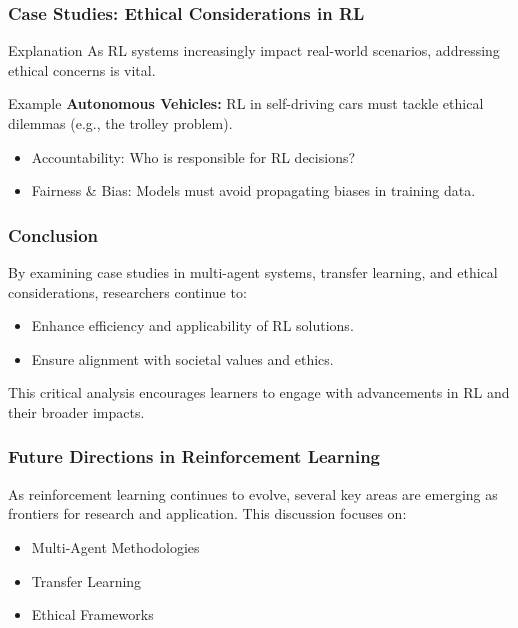 \documentclass[aspectratio=169]{beamer}
\begin{document}
\begin{frame}[fragile]
    \frametitle{Case Studies: Ethical Considerations in RL}
    \begin{block}{Explanation}
        As RL systems increasingly impact real-world scenarios, addressing ethical concerns is vital.
    \end{block}
    
    \begin{block}{Example}
        \textbf{Autonomous Vehicles:} RL in self-driving cars must tackle ethical dilemmas (e.g., the trolley problem).
    \end{block}
    
    \begin{itemize}
        \item Accountability: Who is responsible for RL decisions?
        \item Fairness \& Bias: Models must avoid propagating biases in training data.
    \end{itemize}
\end{frame}

\begin{frame}[fragile]
    \frametitle{Conclusion}
    By examining case studies in multi-agent systems, transfer learning, and ethical considerations, researchers continue to:
    \begin{itemize}
        \item Enhance efficiency and applicability of RL solutions.
        \item Ensure alignment with societal values and ethics.
    \end{itemize}
    This critical analysis encourages learners to engage with advancements in RL and their broader impacts.
\end{frame}

\begin{frame}[fragile]
    \frametitle{Future Directions in Reinforcement Learning}
    As reinforcement learning continues to evolve, several key areas are emerging as frontiers for research and application. This discussion focuses on:
    \begin{itemize}
        \item Multi-Agent Methodologies
        \item Transfer Learning
        \item Ethical Frameworks
    \end{itemize}
\end{frame}
\end{document}
